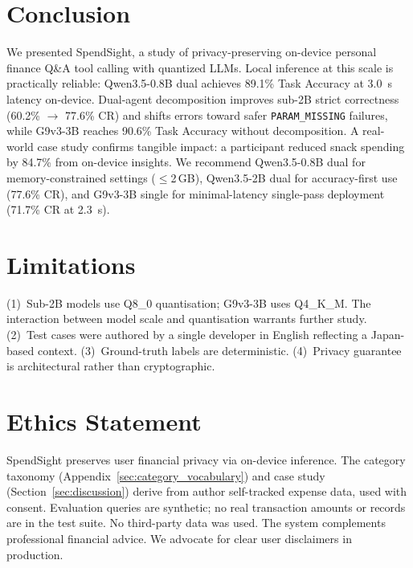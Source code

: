 \documentclass[11pt,twocolumn]{article}
\begin{document}
\section{Conclusion}
\vspace{-2pt}

We presented SpendSight, a study of privacy-preserving on-device personal finance Q\&A tool calling with quantized LLMs.
Local inference at this scale is practically reliable: Qwen3.5-0.8B dual achieves 89.1\% Task Accuracy at 3.0~s latency on-device.
Dual-agent decomposition improves sub-2B strict correctness (60.2\% $\to$ 77.6\% CR) and shifts errors toward safer \texttt{PARAM\_MISSING} failures, while G9v3-3B reaches 90.6\% Task Accuracy without decomposition.
A real-world case study confirms tangible impact: a participant reduced snack spending by 84.7\% from on-device insights.
We recommend Qwen3.5-0.8B dual for memory-constrained settings ($\leq$2\,GB), Qwen3.5-2B dual for accuracy-first use (77.6\% CR), and G9v3-3B single for minimal-latency single-pass deployment (71.7\% CR at 2.3~s).

\vspace{-4pt}
\section*{Limitations}
\vspace{-2pt}

(1)~Sub-2B models use Q8\_0 quantisation; G9v3-3B uses Q4\_K\_M. The interaction between model scale and quantisation warrants further study.
(2)~Test cases were authored by a single developer in English reflecting a Japan-based context.
(3)~Ground-truth labels are deterministic.
(4)~Privacy guarantee is architectural rather than cryptographic.

\vspace{-4pt}
\section*{Ethics Statement}
\vspace{-2pt}

SpendSight preserves user financial privacy via on-device inference.
The category taxonomy (Appendix~\ref{sec:category_vocabulary}) and case study (Section~\ref{sec:discussion}) derive from author self-tracked expense data, used with consent.
Evaluation queries are synthetic; no real transaction amounts or records are in the test suite.
No third-party data was used.
The system complements professional financial advice.
We advocate for clear user disclaimers in production.
\end{document}
